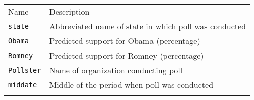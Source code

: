 \documentclass[]{article}
\begin{document}
\begin{longtable}[c]{@{}ll@{}}
\toprule\addlinespace
\begin{minipage}[b]{0.25\columnwidth}\raggedright
Name
\end{minipage} & \begin{minipage}[b]{0.68\columnwidth}\raggedright
Description
\end{minipage}
\\\addlinespace
\midrule\endhead
\begin{minipage}[t]{0.25\columnwidth}\raggedright
\texttt{state}
\end{minipage} & \begin{minipage}[t]{0.68\columnwidth}\raggedright
Abbreviated name of state in which poll was conducted
\end{minipage}
\\\addlinespace
\begin{minipage}[t]{0.25\columnwidth}\raggedright
\texttt{Obama}
\end{minipage} & \begin{minipage}[t]{0.68\columnwidth}\raggedright
Predicted support for Obama (percentage)
\end{minipage}
\\\addlinespace
\begin{minipage}[t]{0.25\columnwidth}\raggedright
\texttt{Romney}
\end{minipage} & \begin{minipage}[t]{0.68\columnwidth}\raggedright
Predicted support for Romney (percentage)
\end{minipage}
\\\addlinespace
\begin{minipage}[t]{0.25\columnwidth}\raggedright
\texttt{Pollster}
\end{minipage} & \begin{minipage}[t]{0.68\columnwidth}\raggedright
Name of organization conducting poll
\end{minipage}
\\\addlinespace
\begin{minipage}[t]{0.25\columnwidth}\raggedright
\texttt{middate}
\end{minipage} & \begin{minipage}[t]{0.68\columnwidth}\raggedright
Middle of the period when poll was conducted
\end{minipage}
\\\addlinespace
\bottomrule
\end{longtable}
\end{document}
